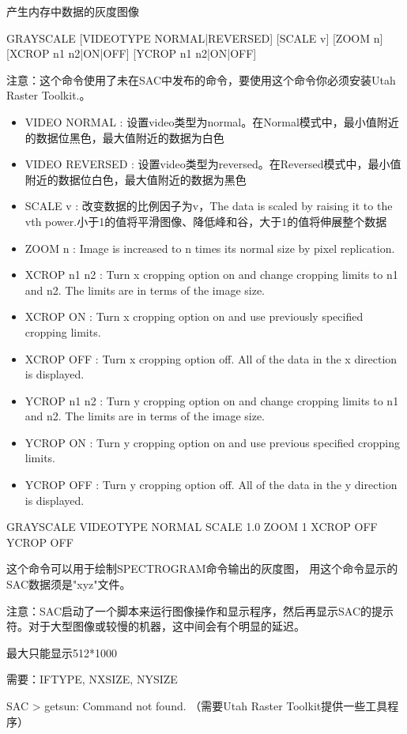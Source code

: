 \label{cmd:grayscale}

产生内存中数据的灰度图像

\begin{SACSTX}
GRAYSCALE [VIDEOTYPE NORMAL|REVERSED] [SCALE v] [ZOOM n] [XCROP n1 n2|ON|OFF] 
    [YCROP n1 n2|ON|OFF]
\end{SACSTX}

注意：这个命令使用了未在SAC中发布的命令，要使用这个命令你必须安装Utah Raster Toolkit.。

\begin{itemize}
\item VIDEO NORMAL : 设置video类型为normal。在Normal模式中，最小值附近的数据位黑色，最大值附近的数据为白色
\item VIDEO REVERSED : 设置video类型为reversed。在Reversed模式中，最小值附近的数据位白色，最大值附近的数据为黑色
\item SCALE v : 改变数据的比例因子为v，The data is scaled by raising it to the vth power.小于1的值将平滑图像、降低峰和谷，大于1的值将伸展整个数据
\item ZOOM n : Image is increased to n times its normal size by pixel replication.
\item XCROP n1 n2 : Turn x cropping option on and change cropping limits to n1 and n2. The limits are in terms of the image size.
\item XCROP {ON} : Turn x cropping option on and use previously specified cropping limits.
\item XCROP OFF :  Turn x cropping option off.  All of the data in the x direction is displayed.
\item YCROP n1 n2 : Turn y cropping option on and change cropping limits to n1 and n2. The limits are in terms of the image size.
\item YCROP {ON} : Turn y cropping option on and use previous specified cropping limits.
\item YCROP OFF :  Turn y cropping option off.  All of the data in the y direction is displayed. 
\end{itemize}

\begin{SACDFT}
GRAYSCALE VIDEOTYPE NORMAL SCALE 1.0 ZOOM 1 XCROP OFF YCROP OFF
\end{SACDFT}

这个命令可以用于绘制SPECTROGRAM命令输出的灰度图， 用这个命令显示的SAC数据须是"xyz"文件。

注意：SAC启动了一个脚本来运行图像操作和显示程序，然后再显示SAC的提示符。对于大型图像或较慢的机器，这中间会有个明显的延迟。

最大只能显示512*1000

需要：IFTYPE, NXSIZE, NYSIZE

SAC > getsun: Command not found.  （需要Utah Raster Toolkit提供一些工具程序）


